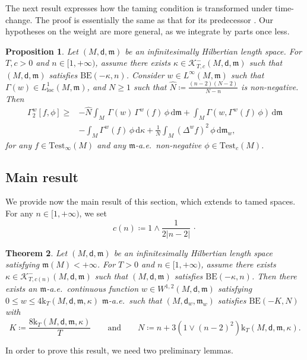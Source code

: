 \documentclass[10pt]{article}
\newcommand{\K}{\mathscr{K}}
\newcommand{\m}{\mathfrak{m}}
\newcommand{\M}{{\mathit{M}}}
\renewcommand{\d}{\,\mathrm{d}}
\newcommand{\Test}{\mathrm{Test}}
\newcommand{\loc}{{\mathrm{loc}}}
\renewcommand{\k}{\mathrm{k}}
\newcommand{\dist}{\mathsf{d}}
\newcommand{\df}{\coloneqq}
\newcommand{\BE}{{\mathrm{BE}}}
\theoremstyle{plain}
\newtheorem{theorem}{Theorem}[section]
\newtheorem{proposition}[theorem]{Proposition}
\theoremstyle{definition}
\newcommand{\Sob}{W^{1,2}(M,\dist,\m)}
\begin{document}
The next result expresses how the taming condition is transformed under time-change. The proof is essentially the same as that for its predecessor \cite[Thm.~4]{hansturm}. Our hypotheses on the weight are more general, as we integrate by parts once less.




\begin{proposition}\label{thm:timechange} Let $(M,\dist,\m)$ be an infinitesimally Hilbertian length space. For $T,c>0$ and $n \in [1,+\infty)$, assume there exists $\kappa \in \K^-_{T,c}(\M,\dist,\m)$ such that $(M,\dist,\m)$ satisfies $\BE(-\kappa,n)$. Consider $w\in L^\infty(\M,\m)$ such that $\Gamma(w)\in L^1_\loc(\M,\m)$, and $N \ge 1$ such that  $\hat{N} \df \frac{(n-2)(N-2)}{N-n}$ is non-negative.
Then
\begin{align*}
    \Gamma_2^w[f,\phi]  \geq & - \hat{N}\int_\M \,\Gamma(w)\,\Gamma^w(f)\,\phi\d\m + \int_\M\Gamma(w,\Gamma^w(f)\,\phi)\d\m \\
    &   - \int_\M\Gamma^w(f)\,\phi\d \kappa + \frac{1}{N}\int_\M(\Delta^wf)^2\,\phi\d\m_w,
\end{align*}
for any $f\in\Test_\infty(\M)$ and any $\m$-a.e.~non-negative $\phi\in\Test_c(\M)$.
\end{proposition}


\subsection{Main result}
We provide now the main result of this section, which extends \cite[Theorem 1.1]{CMT_KatoBE} to tamed spaces. For any $n \in [1,+\infty)$, we set $$c(n)\df 1\wedge \frac{1}{2|n-2|}\, \cdot $$


\begin{theorem}\label{thm:BE}Let $(M,\dist,\m)$ be an infinitesimally Hilbertian length space satisfying $\m(M)<+\infty$. For $T>0$ and $n \in [1,+\infty)$, assume there exists $\kappa \in \K^-_{T,c(n)}(M,\dist,\m)$ such that $(M,\dist,\m)$ satisfies $\mathrm{BE}(-\kappa,n)$. Then there exists an $\m$-a.e.~continuous function $w\in \Sob$ satisfying $0\leq w\leq 4\k_T(\M,\dist,\m,\kappa)$ $\m$-a.e.~such that $(\M,\dist_w,\m_w)$ satisfies $\mathrm{BE}(-K,N)$ with
\[
K \df \frac{8\k_T(\M,\dist,\m,\kappa)}{T} \qquad \text{and} \qquad N \df n+3(1\vee (n-2)^2)\k_T(\M,\dist,\m,\kappa).
\]
\end{theorem}


In order to prove this result, we need two preliminary lemmas. 
\end{document}
